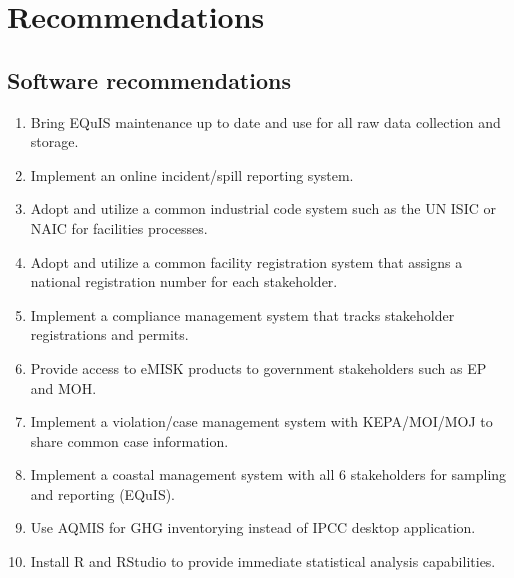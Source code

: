 \chapter{Recommendations}

\section{Software recommendations}
\begin{enumerate}
\item Bring EQuIS maintenance up to date and use for all raw data collection and storage.
\item Implement an online incident/spill reporting system.
\item Adopt and utilize a common industrial code system such as the UN ISIC or NAIC for facilities processes.
\item Adopt and utilize a common facility registration system that assigns a national registration number for each stakeholder. 
\item Implement a compliance management system that tracks stakeholder registrations and permits.
\item Provide access to eMISK products to government stakeholders such as EP and MOH.
\item Implement a violation/case management system with KEPA/MOI/MOJ to share common case information.
\item Implement a coastal management system with all 6 stakeholders for sampling and reporting (EQuIS).
\item Use AQMIS for GHG inventorying instead of IPCC desktop application.
\item Install R and RStudio to provide immediate statistical analysis capabilities.
\end{enumerate}

